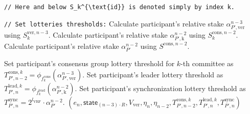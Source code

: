 \begin{protocol}
\begin{algorithmic}[1]
        \noindent
        \lstinline|// Here and below S_k^{\text{id}} is denoted simply by index k.|

        \noindent
        \lstinline|// Set lotteries thresholds:|
        \State Calculate participant's relative stake $\alpha^{n-3}_{P', \text{ver}}$ using $S_k^{\text{ver}, {n - 3}}$.
        \State Calculate participant's relative stake $\alpha^{n-2}_{P', \text{k}}$ using $S_k^{\text{cons}, {n - 2}}$.
        \State Calculate participant's relative stake $\alpha^{n-2}_{P'}$ using $S^{\text{cons}, {n - 2}}$.

        \State Set participant's consensus group lottery threshold for $k$-th committee as $T_{P', n-2}^{\text{cons}, k} = \phi_{f^{\text{cons}}_k}(\alpha^{n-3}_{P', \text{ver}})$.
        \State Set participant's leader lottery threshold as $T_{P', n}^{\text{lead}, k} = \phi_{f^{\text{lead}}_k}(\alpha^{n-2}_{P', \text{k}})$.
        \State Set participant's synchronization lottery threshold as $T_{P', n}^{\text{sync}} = 2^{l_{\text{VRF}}} \cdot \alpha^{n-2}_{P'}$.
        \State \Return ${(e_n, \textsf{state}_{(n - 3)\cdot R}, V_{\text{ver}}, \eta_{n}, \eta_{n - 2}, T_{P', n-2}^{\text{cons}, k}, T_{P', n}^{\text{lead}, k}, T_{P', n}^{\text{sync}})}$
    \end{algorithmic}\label{alg:prepare-block-validation}
\end{protocol}

